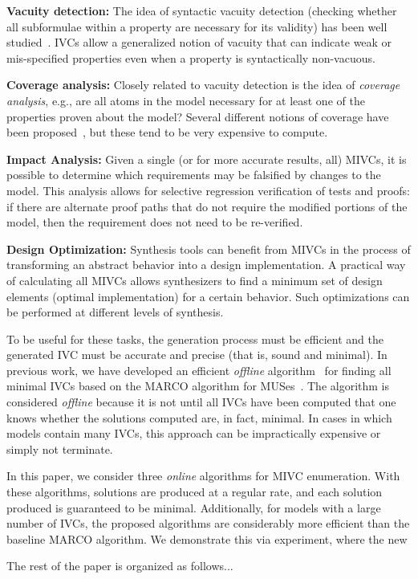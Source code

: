 \noindent \textbf{Vacuity detection:} The idea of syntactic vacuity detection (checking whether all subformulae within a property are necessary for its validity) has been well studied~\cite{Kupferman03:Vacuity}.   IVCs allow a generalized notion of vacuity that can indicate weak or mis-specified properties even when a property is syntactically non-vacuous.

\noindent \textbf{Coverage analysis:} Closely related to vacuity detection is the idea of {\em coverage analysis}, e.g., are all atoms in the model necessary for at least one of the properties proven about the model?  Several different notions of coverage have been proposed~\cite{chockler_coverage_2003,kupferman_theory_2008}, but these tend to be very expensive to compute.

\noindent \textbf{Impact Analysis:} Given a single (or for more accurate results, all) MIVCs, it is possible to determine which requirements may be falsified by changes to the model.  This analysis allows for selective regression verification of tests and proofs: if there are alternate proof paths that do not require the modified portions of the model, then the requirement does not need to be re-verified.

\noindent \textbf{Design Optimization:} Synthesis tools can benefit from MIVCs in the process of transforming an abstract behavior into a design implementation. A practical way of calculating all MIVCs allows synthesizers to find a minimum set of design elements (optimal implementation) for a certain behavior. Such optimizations can be performed at different levels of synthesis.

To be useful for these tasks, the generation process must be efficient and the generated IVC must be accurate and precise (that is, sound and minimal).  In previous work, we have developed an efficient {\em offline} algorithm~\cite{Ghass17AllIVCs} for finding all minimal IVCs based on the MARCO algorithm for MUSes~\cite{marco2016fast}.  The algorithm is considered {\em offline} because it is not until all IVCs have been computed that one knows whether the solutions computed are, in fact, minimal.  In cases in which models contain many IVCs, this approach can be impractically expensive or simply not terminate.


In this paper, we consider three {\em online} algorithms for MIVC enumeration.  With these algorithms, solutions are produced at a regular rate, and each solution produced is guaranteed to be minimal.  Additionally, for models with a large number of IVCs, the proposed algorithms are considerably more efficient than the baseline MARCO algorithm.  We demonstrate this via experiment, where the new 

The rest of the paper is organized as follows...

